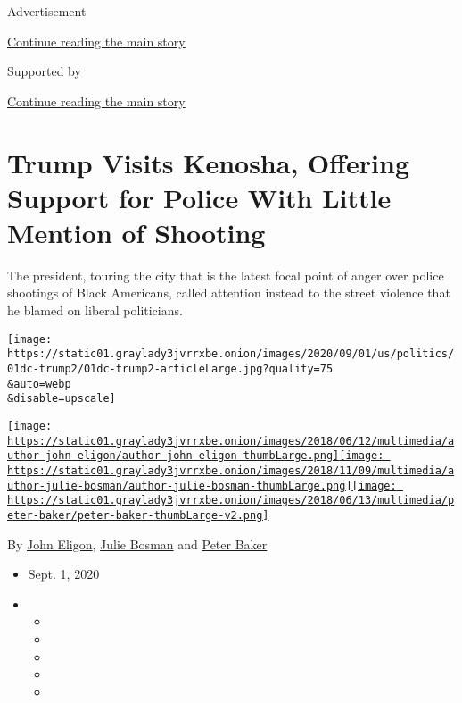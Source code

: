Advertisement

\protect\hyperlink{after-top}{Continue reading the main story}

Supported by

\protect\hyperlink{after-sponsor}{Continue reading the main story}

\hypertarget{trump-visits-kenosha-offering-support-for-police-with-little-mention-of-shooting}{%
\section{Trump Visits Kenosha, Offering Support for Police With Little
Mention of
Shooting}\label{trump-visits-kenosha-offering-support-for-police-with-little-mention-of-shooting}}

The president, touring the city that is the latest focal point of anger
over police shootings of Black Americans, called attention instead to
the street violence that he blamed on liberal politicians.

\texttt{[image: https://static01.graylady3jvrrxbe.onion/images/2020/09/01/us/politics/01dc-trump2/01dc-trump2-articleLarge.jpg?quality=75\\\&auto=webp\\\&disable=upscale]}

\href{https://www.nytimes3xbfgragh.onion/by/john-eligon}{\texttt{[image: https://static01.graylady3jvrrxbe.onion/images/2018/06/12/multimedia/author-john-eligon/author-john-eligon-thumbLarge.png]}}\href{https://www.nytimes3xbfgragh.onion/by/julie-bosman}{\texttt{[image: https://static01.graylady3jvrrxbe.onion/images/2018/11/09/multimedia/author-julie-bosman/author-julie-bosman-thumbLarge.png]}}\href{https://www.nytimes3xbfgragh.onion/by/peter-baker}{\texttt{[image: https://static01.graylady3jvrrxbe.onion/images/2018/06/13/multimedia/peter-baker/peter-baker-thumbLarge-v2.png]}}

By \href{https://www.nytimes3xbfgragh.onion/by/john-eligon}{John
Eligon}, \href{https://www.nytimes3xbfgragh.onion/by/julie-bosman}{Julie
Bosman} and
\href{https://www.nytimes3xbfgragh.onion/by/peter-baker}{Peter Baker}

\begin{itemize}
\item
  Sept. 1, 2020
\item
  \begin{itemize}
  \item
  \item
  \item
  \item
  \item
  \end{itemize}
\end{itemize}

